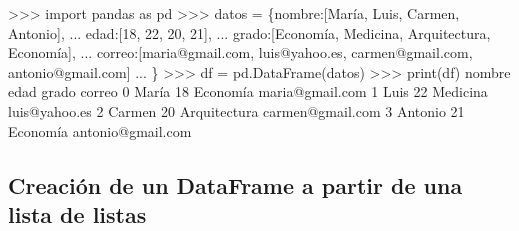\documentclass[
  spanish,
  a4paper,
]{scrreport}
\newenvironment{Shaded}{\begin{snugshade}}{\end{snugshade}}
\newcommand{\BuiltInTok}[1]{\textcolor[rgb]{0.00,0.23,0.31}{#1}}
\newcommand{\DecValTok}[1]{\textcolor[rgb]{0.68,0.00,0.00}{#1}}
\newcommand{\ImportTok}[1]{\textcolor[rgb]{0.00,0.46,0.62}{#1}}
\newcommand{\NormalTok}[1]{\textcolor[rgb]{0.00,0.23,0.31}{#1}}
\newcommand{\OperatorTok}[1]{\textcolor[rgb]{0.37,0.37,0.37}{#1}}
\newcommand{\StringTok}[1]{\textcolor[rgb]{0.13,0.47,0.30}{#1}}
\begin{document}
\begin{Shaded}
\begin{Highlighting}[]
\OperatorTok{\textgreater{}\textgreater{}\textgreater{}} \ImportTok{import}\NormalTok{ pandas }\ImportTok{as}\NormalTok{ pd}
\OperatorTok{\textgreater{}\textgreater{}\textgreater{}}\NormalTok{ datos }\OperatorTok{=}\NormalTok{ \{}\StringTok{\textquotesingle{}nombre\textquotesingle{}}\NormalTok{:[}\StringTok{\textquotesingle{}María\textquotesingle{}}\NormalTok{, }\StringTok{\textquotesingle{}Luis\textquotesingle{}}\NormalTok{, }\StringTok{\textquotesingle{}Carmen\textquotesingle{}}\NormalTok{, }\StringTok{\textquotesingle{}Antonio\textquotesingle{}}\NormalTok{],}
\NormalTok{... }\StringTok{\textquotesingle{}edad\textquotesingle{}}\NormalTok{:[}\DecValTok{18}\NormalTok{, }\DecValTok{22}\NormalTok{, }\DecValTok{20}\NormalTok{, }\DecValTok{21}\NormalTok{],}
\NormalTok{... }\StringTok{\textquotesingle{}grado\textquotesingle{}}\NormalTok{:[}\StringTok{\textquotesingle{}Economía\textquotesingle{}}\NormalTok{, }\StringTok{\textquotesingle{}Medicina\textquotesingle{}}\NormalTok{, }\StringTok{\textquotesingle{}Arquitectura\textquotesingle{}}\NormalTok{, }\StringTok{\textquotesingle{}Economía\textquotesingle{}}\NormalTok{],}
\NormalTok{... }\StringTok{\textquotesingle{}correo\textquotesingle{}}\NormalTok{:[}\StringTok{\textquotesingle{}maria@gmail.com\textquotesingle{}}\NormalTok{, }\StringTok{\textquotesingle{}luis@yahoo.es\textquotesingle{}}\NormalTok{, }\StringTok{\textquotesingle{}carmen@gmail.com\textquotesingle{}}\NormalTok{, }\StringTok{\textquotesingle{}antonio@gmail.com\textquotesingle{}}\NormalTok{]}
\NormalTok{... \}}
\OperatorTok{\textgreater{}\textgreater{}\textgreater{}}\NormalTok{ df }\OperatorTok{=}\NormalTok{ pd.DataFrame(datos)}
\OperatorTok{\textgreater{}\textgreater{}\textgreater{}} \BuiltInTok{print}\NormalTok{(df)}
\NormalTok{    nombre  edad         grado             correo}
\DecValTok{0}\NormalTok{    María    }\DecValTok{18}\NormalTok{      Economía    maria}\OperatorTok{@}\NormalTok{gmail.com}
\DecValTok{1}\NormalTok{     Luis    }\DecValTok{22}\NormalTok{      Medicina      luis}\OperatorTok{@}\NormalTok{yahoo.es}
\DecValTok{2}\NormalTok{   Carmen    }\DecValTok{20}\NormalTok{  Arquitectura   carmen}\OperatorTok{@}\NormalTok{gmail.com}
\DecValTok{3}\NormalTok{  Antonio    }\DecValTok{21}\NormalTok{      Economía  antonio}\OperatorTok{@}\NormalTok{gmail.com}
\end{Highlighting}
\end{Shaded}

\subsection{Creación de un DataFrame a partir de una lista de
listas}\label{creaciuxf3n-de-un-dataframe-a-partir-de-una-lista-de-listas}
\end{document}
